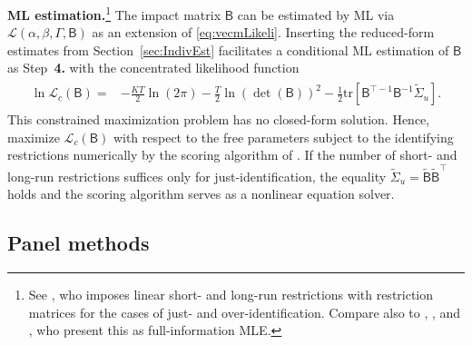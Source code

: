 \textbf{ML estimation.}\footnote{See \citet{Vlaar2004}, who imposes linear short- and long-run restrictions with restriction matrices for the cases of just- and over-identification. Compare also to \citet[Ch.~11, p.~331]{Hamilton1994}, \citet[Ch.~3.2, p.~84]{Lutkepohl2006}, and \citet[Ch.~11.2.2 and p.~315]{KilianLutkepohl2017}, who present this as full-information MLE.} The impact matrix $ \mathsf{B} $ can be estimated by ML via $ \mathcal{L} \left(\alpha, \beta, \Gamma, \mathsf{B} \right) $ as an extension of \eqref{eq:vecmLikeli}. Inserting the reduced-form estimates from Section~\ref{sec:IndivEst} facilitates a conditional ML estimation of $ \mathsf{B} $ as Step~\textbf{4.} with the concentrated likelihood function
\begin{align} \label{eq:svecmLikeli}
\begin{split}
	\ln \mathcal{L}_c \left( \mathsf{B} \right) = & - \frac{KT}{2} \ln \left( 2\pi \right) - \frac{T}{2} \ln \left( \det ( \mathsf{B} ) \right)^2 - \frac{1}{2} \text{tr} \left[ \mathsf{B}^{\top -1} \mathsf{B}^{-1} \widetilde{\Sigma}_u \right].
\end{split}
\end{align}
This constrained maximization problem has no closed-form solution. Hence, \citet{BreitungEtAl2004} maximize $ \mathcal{L}_c \left( \mathsf{B} \right) $ with respect to the free parameters subject to the identifying restrictions numerically by the scoring algorithm of \citet{AmisanoGiannini1997}. If the number of short- and long-run restrictions suffices only for just-identification, the equality $ \widetilde{\Sigma}_u = \mathsf{\widetilde{B}} \mathsf{\widetilde{B}}^\top $ holds and the scoring algorithm serves as a nonlinear equation solver.


\subsection{Panel methods} \label{sec:Panel}

